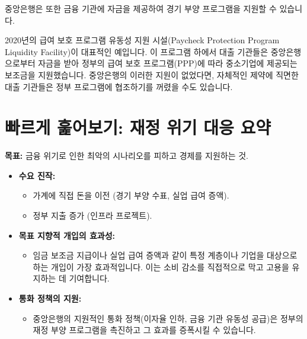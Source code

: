 \documentclass[11pt,a4paper]{book}
\theoremstyle{definition}
\begin{document}
중앙은행은 또한 금융 기관에 자금을 제공하여 경기 부양 프로그램을 지원할 수 있습니다.

\begin{examplebox}[title={예시: 급여 보호 프로그램 유동성 지원 시설 (2020년)}]
    2020년의 급여 보호 프로그램 유동성 지원 시설(Paycheck Protection Program Liquidity Facility)이 대표적인 예입니다. 이 프로그램 하에서 대출 기관들은 중앙은행으로부터 자금을 받아 정부의 급여 보호 프로그램(PPP)에 따라 중소기업에 제공되는 보조금을 지원했습니다. 중앙은행의 이러한 지원이 없었다면, 자체적인 제약에 직면한 대출 기관들은 정부 프로그램에 협조하기를 꺼렸을 수도 있습니다.
\end{examplebox}


\section{빠르게 훑어보기: 재정 위기 대응 요약}

\begin{summarybox}[title={재정 위기 대응의 핵심}]
    \textbf{목표:} 금융 위기로 인한 최악의 시나리오를 피하고 경제를 지원하는 것.
\end{summarybox}

\begin{tcolorbox}[mybox={세 가지 주요 재정 대응 방안}]
    \begin{itemize}
        \item \textbf{수요 진작:}
        \begin{itemize}
            \item 가계에 직접 돈을 이전 (경기 부양 수표, 실업 급여 증액).
            \item 정부 지출 증가 (인프라 프로젝트).
        \end{itemize}
        \item \textbf{목표 지향적 개입의 효과성:}
        \begin{itemize}
            \item 임금 보조금 지급이나 실업 급여 증액과 같이 특정 계층이나 기업을 대상으로 하는 개입이 가장 효과적입니다. 이는 소비 감소를 직접적으로 막고 고용을 유지하는 데 기여합니다.
        \end{itemize}
        \item \textbf{통화 정책의 지원:}
        \begin{itemize}
            \item 중앙은행의 지원적인 통화 정책(이자율 인하, 금융 기관 유동성 공급)은 정부의 재정 부양 프로그램을 촉진하고 그 효과를 증폭시킬 수 있습니다.
        \end{itemize}
    \end{itemize}
\end{tcolorbox}
\end{document}
